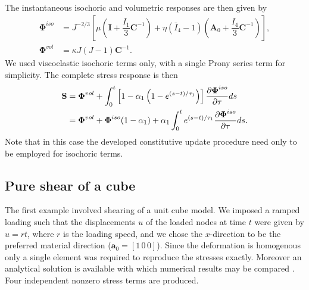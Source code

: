 The instantaneous isochoric and volumetric responses are then given by
\begin{align}
\boldsymbol \Phi^{iso} &= J^{-2/3} \left[ \mu \left( \mathbf{I} + \dfrac{I_1}{3} \mathbf{C}^{-1} \right) + \eta (\bar{I}_4 - 1) \left( \mathbf{A}_0 + \dfrac{I_4}{3} \mathbf{C}^{-1} \right) \right], \\
\boldsymbol \Phi^{vol} &= \kappa J (J - 1) \mathbf{C}^{-1}.
\end{align}
We used viscoelastic isochoric terms only, with a single Prony series term for simplicity. The complete stress response is then
\begin{align}
\mathbf{S} &= \boldsymbol \Phi^{vol} + \int_0^t \left[ 1 - \alpha_1 \left(1-e^{(s-t)/\tau_1} \right) \right] \dfrac{\partial \boldsymbol \Phi^{iso}}{\partial \tau} ds \notag \\
&= \boldsymbol \Phi^{vol} + \boldsymbol \Phi^{iso}(1 - \alpha_1) + \alpha_1 \int_0^t e^{(s-t)/\tau_1} \dfrac{\partial \boldsymbol \Phi^{iso}}{\partial \tau} ds.
\end{align}
Note that in this case the developed constitutive update procedure need only to be employed for isochoric terms. 




	\subsection{Pure shear of a cube}
The first example involved shearing of a unit cube model. We imposed a ramped loading such that the displacements $u$ of the loaded nodes at time $t$ were given by $u = rt$, where $r$ is the loading speed, and we chose the $x$-direction to be the preferred material direction ($\mathbf{a}_0 = [1\, 0\, 0 ]$). Since the deformation is homogenous only a single element was required to reproduce the stresses exactly. Moreover an analytical solution is available with which numerical results may be compared \citep{Taylor2009}. Four independent nonzero stress terms are produced. 
	
